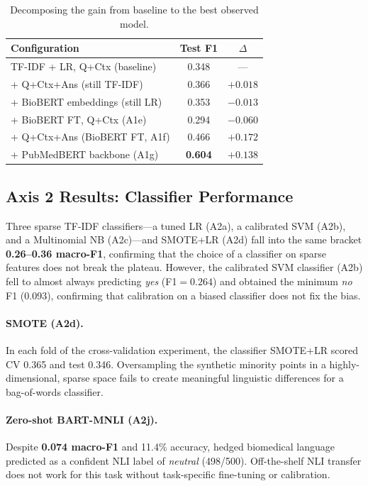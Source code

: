 \documentclass[11pt]{article}
\begin{document}
\begin{table}[t]
\centering
\caption{Decomposing the gain from baseline to the best observed model.}
\label{tab:decompose}
\small
\setlength{\tabcolsep}{4pt}
\begin{tabular}{@{}p{4.8cm}cc@{}}
\toprule
\textbf{Configuration} & \textbf{Test F1} & \textbf{$\Delta$} \\
\midrule
TF-IDF + LR, Q+Ctx (baseline)                      & 0.348 & --- \\
+ Q+Ctx+Ans (still TF-IDF)                         & 0.366 & $+0.018$ \\
+ BioBERT embeddings (still LR)                    & 0.353 & $-0.013$ \\
+ BioBERT FT, Q+Ctx (A1e)                          & 0.294 & $-0.060$ \\
+ Q+Ctx+Ans (BioBERT FT, A1f)                      & 0.466 & $+0.172$ \\
+ PubMedBERT backbone (A1g)                        & \textbf{0.604} & $+0.138$ \\
\bottomrule
\end{tabular}
\end{table}

\subsection{Axis 2 Results: Classifier Performance}

Three sparse TF-IDF classifiers---a tuned LR (A2a), a calibrated SVM (A2b), and a Multinomial NB (A2c)---and SMOTE+LR (A2d) fall into the same bracket \textbf{0.26--0.36 macro-F1}, confirming that the choice of a classifier on sparse features does not break the plateau. However, the calibrated SVM classifier (A2b) fell to almost always predicting \textit{yes} (F1${}={}0.264$) and obtained the minimum \textit{no} F1 (0.093), confirming that calibration on a biased classifier does not fix the bias.

\paragraph{SMOTE (A2d).} In each fold of the cross-validation experiment, the classifier SMOTE+LR scored CV 0.365 and test 0.346. Oversampling the synthetic minority points in a highly-dimensional, sparse space fails to create meaningful linguistic differences for a bag-of-words classifier.

\paragraph{Zero-shot BART-MNLI (A2j).} Despite \textbf{0.074 macro-F1} and 11.4\% accuracy, hedged biomedical language predicted as a confident NLI label of \emph{neutral} (498/500). Off-the-shelf NLI transfer does not work for this task without task-specific fine-tuning or calibration.
\end{document}
